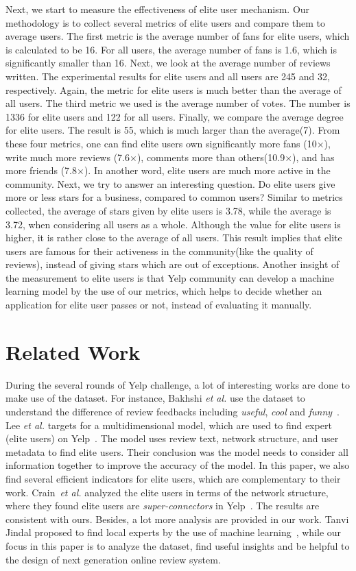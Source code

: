 \documentclass[10pt]{sig-alternate-10pt}   	%
\begin{document}
Next, we start to measure the effectiveness of elite user mechanism. Our methodology is to collect several 
metrics of elite users and compare them to average users.
The first metric is the average number of fans for elite users, which is calculated to be 16. For all users, the average 
number of fans is 1.6, which is significantly smaller than 16. Next, we look at the average number of reviews written. 
The experimental results for elite users and all users are 245 and 32, respectively. Again, the metric for elite users 
is much better than the average of all users. The third metric we used is the average number of votes. The number is
1336 for elite users and 122 for all users. Finally, we compare the average degree for elite users. The result is 55, which 
is much larger than the average(7). From these four metrics, one can find elite users own significantly more fans 
(10$\times$), write much more reviews (7.6$\times$), comments more than others(10.9$\times$), and has more friends
(7.8$\times$). In another word, elite users are much more active in the community. Next, we try to answer an interesting 
question. Do elite users give more or less stars for a business, compared to common users? 
Similar to metrics collected, the average of stars given by 
elite users is 3.78, while the average is 3.72, when considering all users as a whole. Although the value for elite users
is higher, it is rather close to the average of all users. This result implies that elite users are famous for their activeness 
in the community(like the quality of reviews), instead of giving stars which are out of exceptions. Another insight of the 
measurement to elite users is that Yelp community can develop a machine learning model by the use of our metrics, 
which helps to decide whether an application for elite user passes or not, instead of evaluating it manually. 

\section{Related Work}
During the several rounds of Yelp challenge, a lot of interesting works are done to make use of the dataset. 
For instance, Bakhshi \textit{et al.} use the dataset to understand the difference of review feedbacks including 
\textit{useful}, \textit{cool} and \textit{funny}~\cite{cscw}. Lee \textit{et al.} targets for a multidimensional model, 
which are used to find expert (elite users) on Yelp~\cite{expert}. The model uses review text, network structure, 
and user metadata to find elite users. Their conclusion was the model needs to consider all information together 
to improve the accuracy of the model. In this paper, we also find several efficient indicators for elite users, 
which are complementary to their work. Crain~\textit{et al.} analyzed the elite users in terms of the network 
structure, where they found elite users are \textit{super-connectors}  in Yelp~\cite{stanford}. 
The results are consistent with ours. Besides, a lot more analysis are provided in our work. Tanvi Jindal proposed 
to find local experts by the use of machine learning~\cite{local}, while our focus in this paper is to analyze the 
dataset, find useful insights and be helpful to the design of next generation online review system.
\end{document}
